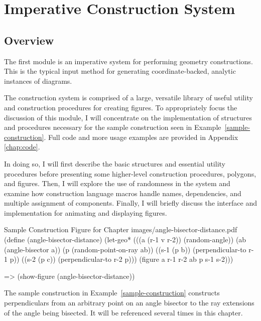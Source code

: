 \chapter{Imperative Construction System}
\label{chap:imperative}

\section{Overview}

The first module is an imperative system for performing geometry
constructions. This is the typical input method for generating
coordinate-backed, analytic instances of diagrams.

The construction system is comprised of a large, versatile library of
useful utility and construction procedures for creating figures. To
appropriately focus the discussion of this module, I will concentrate
on the implementation of structures and procedures necessary for the
sample construction seen in Example~\ref{sample-construction}.  Full
code and more usage examples are provided in Appendix \ref{chap:code}.

In doing so, I will first describe the basic structures and essential
utility procedures before presenting some higher-level construction
procedures, polygons, and figures. Then, I will explore the use of
randomness in the system and examine how construction language macros
handle names, dependencies, and multiple assignment of components.
Finally, I will briefly discuss the interface and implementation for
animating and displaying figures.

\begin{pdf-example}
[label=sample-construction]
{Sample Construction Figure for Chapter}
{images/angle-bisector-distance.pdf}
(define (angle-bisector-distance)
  (let-geo* (((a (r-1 v r-2)) (random-angle))
             (ab (angle-bisector a))
             (p (random-point-on-ray ab))
             ((s-1 (p b)) (perpendicular-to r-1 p))
             ((s-2 (p c)) (perpendicular-to r-2 p)))
     (figure a r-1 r-2 ab p s-1 s-2)))

=> (show-figure (angle-bisector-distance))
\end{pdf-example}

The sample construction in Example~\ref{sample-construction}
constructs perpendiculars from an arbitrary point on an angle bisector
to the ray extensions of the angle being bisected. It will be
referenced several times in this chapter.


